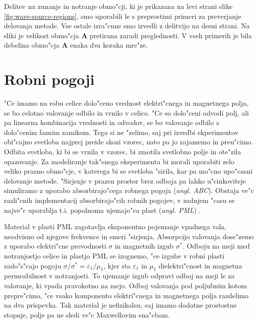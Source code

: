 \documentclass[12pt,twoside,openright,final]{report}
\newcommand{\eps}{\varepsilon}
\newcommand{\angl}[1]{(\textit{angl. #1})}
\begin{document}
Delitev na zunanje in notranje obmo"cji, ki je prikazana na levi strani slike \ref{fig:wave-source-regions}, smo uporabili le s preprostimi primeri za preverjanje delovanja metode. 
Vse ostale izra"cune smo izvedli z delitvijo na desni strani. 
Na sliki je velikost obmo"cja \textbf{A} pretirana zaradi preglednosti. 
V vseh primerih je bila debelina obmo"cja \textbf{A} enaka dva koraka mre"ze. 

\section{Robni pogoji}

"Ce imamo na robu celice dolo"ceno vrednost elektri"cnega in magnetnega polja, se bo celotno valovanje odbilo in vrnilo v celico. 
"Ce so dolo"ceni odvodi polj, ali pa linearna kombinacija vrednosti in odvodov, se bo valovanje odbilo z dolo"cenim faznim zamikom. 
Tega si ne "zelimo, saj pri izvedbi ekperimentov obi"cajno svetloba najprej preide skozi vzorec, nato pa jo zajamemo in preu"cimo. 
Odbita svetloba, ki bi se vrnila v vzorec, bi zmotila svetlobno polje in ote"zila opazovanje. 
Za modeliranje tak"snega eksperimenta bi morali uporabiti zelo veliko prazno obmo"cje, v katerega bi se svetloba "sirila, kar pa mo"cno upo"casni delovanje metode. 
"Sirjenje v prazen prostor brez odboja pa lahko u"cinkoviteje simuliramo z uporabo absorbirajo"cega robnega pogoja \angl{\ac{ABC}}. 
Obstaja ve"c razli"cnih implementacij absorbirajo"cih robnih pogojev, v zadnjem "casu se najve"c uporablja t.i. popolnoma ujemajo"ca plast \angl{\ac{PML}} \cite{taflove,berenger}. 

Material v plasti \acs{PML} zagotavlja eksponentno pojemanje vpadnega vala, neodvisno od njegove frekvence in smeri "sirjenja. 
Absorpcijo valovanja dose"zemo z uporabo elektri"cne prevodnosti $\sigma$ in magnetnih izgub $\sigma^\ast$. 
Odboju na meji med notranjostjo celice in plastjo \acs{PML} se izognemo, "ce izgube v robni plasti zado"s"cajo pogoju $\sigma/\sigma^\ast = \eps_1/\mu_1$, kjer sta $\eps_1$ in $\mu_1$ dielektri"cnost in magnetna permeabilnost v notranjosti. 
To ujemanje izgub odpravi odboj na meji le za valovanje, ki vpada pravokotno na mejo. 
Odboj valovanja pod poljubnim kotom prepre"cimo, "ce vsako komponento elektri"cnega in magnetnega polja razdelimo na dva prispevka. 
Tak material je nefizikalen, saj imamo dodatne prostostne stopnje, polje pa ne sledi ve"c Maxwellovim ena"cbam. 
\end{document}
